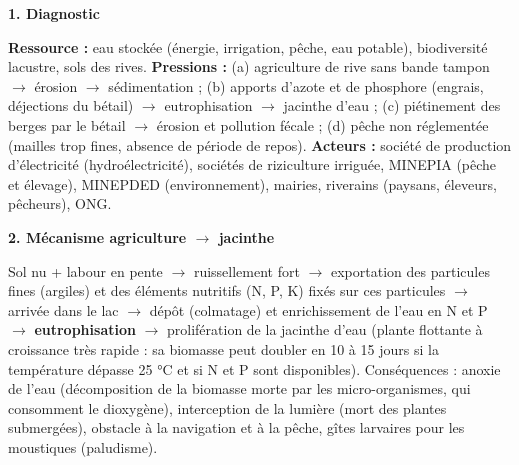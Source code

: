 \documentclass[11pt]{article}
\begin{document}
\begin{corrige}
\textbf{1. Diagnostic}\par
\textbf{Ressource :} eau stockée (énergie, irrigation, pêche, eau potable), biodiversité lacustre, sols des rives.
\textbf{Pressions :} (a) agriculture de rive sans bande tampon $\rightarrow$ érosion $\rightarrow$ sédimentation ; (b) apports d'azote et de phosphore (engrais, déjections du bétail) $\rightarrow$ eutrophisation $\rightarrow$ jacinthe d'eau ; (c) piétinement des berges par le bétail $\rightarrow$ érosion et pollution fécale ; (d) pêche non réglementée (mailles trop fines, absence de période de repos).
\textbf{Acteurs :} société de production d'électricité (hydroélectricité), sociétés de riziculture irriguée, MINEPIA (pêche et élevage), MINEPDED (environnement), mairies, riverains (paysans, éleveurs, pêcheurs), ONG.

\textbf{2. Mécanisme agriculture $\rightarrow$ jacinthe}\par
Sol nu + labour en pente $\rightarrow$ ruissellement fort $\rightarrow$ exportation des particules fines (argiles) et des éléments nutritifs (N, P, K) fixés sur ces particules $\rightarrow$ arrivée dans le lac $\rightarrow$ dépôt (colmatage) et enrichissement de l'eau en N et P $\rightarrow$ \textbf{eutrophisation} $\rightarrow$ prolifération de la jacinthe d'eau (plante flottante à croissance très rapide : sa biomasse peut doubler en 10 à 15 jours si la température dépasse 25 °C et si N et P sont disponibles). Conséquences : anoxie de l'eau (décomposition de la biomasse morte par les micro-organismes, qui consomment le dioxygène), interception de la lumière (mort des plantes submergées), obstacle à la navigation et à la pêche, gîtes larvaires pour les moustiques (paludisme).


\end{corrige}
\end{document}
